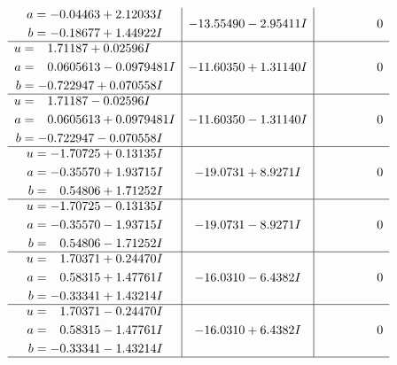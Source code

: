 \documentclass[1p]{elsarticle_modified}
\theoremstyle{definition}
\begin{document}
$$\begin{array}{c|c|c}
\begin{aligned}
a &= -0.04463 + 2.12033 I \\
b &= -0.18677 + 1.44922 I\end{aligned}
 & -13.55490 - 2.95411 I & \phantom{-0.000000 } 0 \\ \hline\begin{aligned}
u &= \phantom{-}1.71187 + 0.02596 I \\
a &= \phantom{-}0.0605613 - 0.0979481 I \\
b &= -0.722947 + 0.070558 I\end{aligned}
 & -11.60350 + 1.31140 I & \phantom{-0.000000 } 0 \\ \hline\begin{aligned}
u &= \phantom{-}1.71187 - 0.02596 I \\
a &= \phantom{-}0.0605613 + 0.0979481 I \\
b &= -0.722947 - 0.070558 I\end{aligned}
 & -11.60350 - 1.31140 I & \phantom{-0.000000 } 0 \\ \hline\begin{aligned}
u &= -1.70725 + 0.13135 I \\
a &= -0.35570 + 1.93715 I \\
b &= \phantom{-}0.54806 + 1.71252 I\end{aligned}
 & -19.0731 + 8.9271 I & \phantom{-0.000000 } 0 \\ \hline\begin{aligned}
u &= -1.70725 - 0.13135 I \\
a &= -0.35570 - 1.93715 I \\
b &= \phantom{-}0.54806 - 1.71252 I\end{aligned}
 & -19.0731 - 8.9271 I & \phantom{-0.000000 } 0 \\ \hline\begin{aligned}
u &= \phantom{-}1.70371 + 0.24470 I \\
a &= \phantom{-}0.58315 + 1.47761 I \\
b &= -0.33341 + 1.43214 I\end{aligned}
 & -16.0310 - 6.4382 I & \phantom{-0.000000 } 0 \\ \hline\begin{aligned}
u &= \phantom{-}1.70371 - 0.24470 I \\
a &= \phantom{-}0.58315 - 1.47761 I \\
b &= -0.33341 - 1.43214 I\end{aligned}
 & -16.0310 + 6.4382 I & \phantom{-0.000000 } 0\\
 \hline 
 \end{array}$$\newpage$$\begin{array}{c|c|c}  

\end{array}$$
\end{document}
